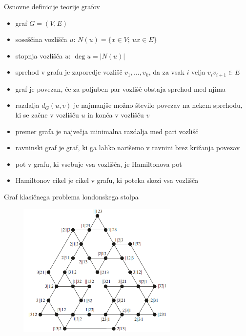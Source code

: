 \documentclass[dvipsnames]{beamer}
\DeclareMathOperator {\stopnja} {deg}
\begin{document}
\begin{frame}{Osnovne definicije teorije grafov}
    \begin{itemize}
        \item graf $ G = (V, E) $
        \item \alert{soseščina} vozlišča $u$: $N(u) = \{x \in V;\ ux \in E\}$
        \item \alert{stopnja} vozlišča $u$: $\stopnja u  = \lvert N(u) \rvert$
        \item \alert{sprehod} v grafu je zaporedje vozlišč $v_1,\ldots, v_k$, da za vsak $i$ velja $v_i v_{i+1} \in E$
        \item graf je \alert{povezan}, če za poljuben par vozlišč obstaja sprehod med njima
        \item \alert{razdalja} $d_G(u,v)$ je najmanjše možno število povezav na nekem sprehodu, ki se začne v vozlišču $u$ in konča v vozlišču $v$
        \item \alert{premer} grafa je največja minimalna razdalja med pari vozlišč
    \end{itemize}
\end{frame}

\begin{frame}
    \begin{itemize}
        \item \alert{ravninski} graf je graf, ki ga lahko narišemo v ravnini brez križanja povezav
        \item pot v grafu, ki vsebuje vsa vozlišča, je \alert{Hamiltonova pot}
        \item \alert{Hamiltonov cikel} je cikel v grafu, ki poteka skozi vsa vozlišča
    \end{itemize}
\end{frame}



\begin{frame}{Graf klasičnega problema londonskega stolpa}
    
    \begin{figure}
        \centering
        \includegraphics[height=190pt]{../img/tolgraph.png}
    \end{figure}
\end{frame}
\end{document}
